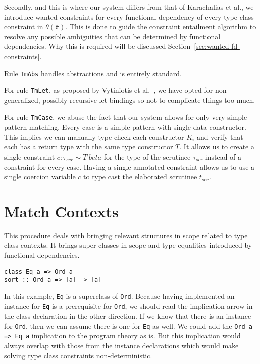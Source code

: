 Secondly, and this is where our system differs from that of Karachalias et
al.\cite{Karachalias:2017:EFD:3156695.3122966}, we introduce wanted constraints
for every functional dependency of every type class constraint in
$\theta(\overline{\pi})$. This is done to guide the constraint entailment
algorithm to resolve any possible ambiguities that can be determined by
functional dependencies. Why this is required will be discussed
Section~\ref{sec:wanted-fd-constraints}.

Rule \texttt{TmAbs} handles abstractions and is entirely standard.

For rule \texttt{TmLet}, as proposed by Vytiniotis et al.~\cite{vytiniotis}, we
have opted for non-generalized, possibly recursive let-bindings so not to
complicate things too much.

For rule \texttt{TmCase}, we abuse the fact that our system allows for only very
simple pattern matching. Every case is a simple pattern with single data
constructor. This implies we can manually type check each constructor $K_i$ and
verify that each has a return type with the same type constructor $T$. It allows
us to create a single constraint $c : \tau_{scr} \sim T \; \overline{beta}$ for
the type of the scrutinee $\tau_{scr}$ instead of a constraint for every case.
Having a single annotated constraint allows us to use a single coercion variable
$c$ to type cast the elaborated scrutinee $t_{scr}$.

\section{Match Contexts}
\label{sec:match-contexts}

This procedure deals with bringing relevant structures in scope related
to type class contexts. It brings super classes in scope and type equalities
introduced by functional dependencies.
\begin{verbatim}
class Eq a => Ord a
sort :: Ord a => [a] -> [a]
\end{verbatim}
In this example, \texttt{Eq} is a superclass of \texttt{Ord}. Because having
implemented an instance for \texttt{Eq} is a prerequisite for \texttt{Ord}, we
should read the implication arrow in the class declaration in the other
direction. If we know that there is an instance for \texttt{Ord}, then we can
assume there is one for \texttt{Eq} as well. We could add the \texttt{Ord a =>
Eq a} implication to the program theory as is. But this implication would
always overlap with those from the instance declarations which would make
solving type class constraints non-deterministic.

